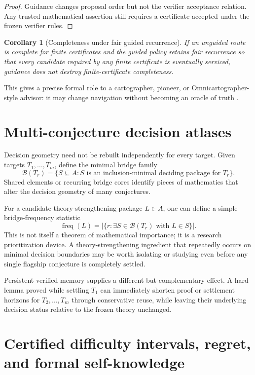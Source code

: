 \documentclass[11pt]{article}
\newtheorem{corollary}[definition]{Corollary}
\theoremstyle{remark}
\begin{document}
\begin{proof}
Guidance changes proposal order but not the verifier acceptance relation. Any trusted mathematical assertion still requires a certificate accepted under the frozen verifier rules.
\end{proof}

\begin{corollary}[Completeness under fair guided recurrence]
If an unguided route is complete for finite certificates and the guided policy retains fair recurrence so that every candidate required by any finite certificate is eventually serviced, guidance does not destroy finite-certificate completeness.
\end{corollary}

This gives a precise formal role to a cartographer, pioneer, or Omnicartographer-style advisor: it may change navigation without becoming an oracle of truth \cite{omni}.

\section{Multi-conjecture decision atlases}

Decision geometry need not be rebuilt independently for every target. Given targets $T_1,\ldots,T_m$, define the minimal bridge family
\[
\mathcal B(T_r)=\{S\subseteq A:S\text{ is an inclusion-minimal deciding package for }T_r\}.
\]
Shared elements or recurring bridge cores identify pieces of mathematics that alter the decision geometry of many conjectures.

For a candidate theory-strengthening package $L\in A$, one can define a simple bridge-frequency statistic
\[
\operatorname{freq}(L)=|\{r:\exists S\in\mathcal B(T_r)\text{ with }L\in S\}|.
\]
This is not itself a theorem of mathematical importance; it is a research prioritization device. A theory-strengthening ingredient that repeatedly occurs on minimal decision boundaries may be worth isolating or studying even before any single flagship conjecture is completely settled.

Persistent verified memory supplies a different but complementary effect. A hard lemma proved while settling $T_1$ can immediately shorten proof or settlement horizons for $T_2,\ldots,T_m$ through conservative reuse, while leaving their underlying decision status relative to the frozen theory unchanged.

\section{Certified difficulty intervals, regret, and formal self-knowledge}
\end{document}
